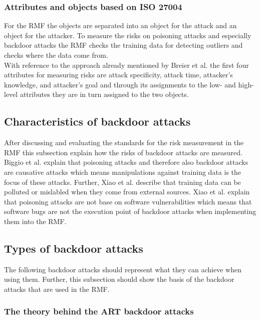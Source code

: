 \subsubsection*{Attributes and objects based on ISO 27004}

For the RMF the objects are separated into an object for the attack and an object for the attacker. To measure the risks on poisoning attacks and especially backdoor attacks the RMF checks the training data for detecting outliers and checks where the data come from. \\ With reference to the approach already mentioned by Breier et al. \cite{DBLP:journals/corr/abs-2012-04884} the first four attributes for measuring risks are attack specificity, attack time, attacker's knowledge, and attacker's goal and through its assignments to the low- and high-level attributes they are in turn assigned to the two objects. \\

\subsection{Characteristics of backdoor attacks}

After discussing and evaluating the standards for the risk measurement in the RMF this subsection explain how the risks of backdoor attacks are measured. Biggio et al. \cite{DBLP:conf/icml/BiggioNL12} explain that poisoning attacks and therefore also backdoor attacks are causative attacks which means manipulations against training data is the focus of these attacks. Further, Xiao et al. \cite{DBLP:conf/sp/XiaoLZX18} describe that training data can be polluted or mislabled when they come from external sources. Xiao et al. explain that poisoning attacks are not base on software vulnerabilities which means that software bugs are not the execution point of backdoor attacks when implementing them into the RMF.

\subsection{Types of backdoor attacks}

The following backdoor attacks should represent what they can achieve when using them. Further, this subsection should show the basis of the backdoor attacks that are used in the RMF.

\subsubsection*{The theory behind the ART backdoor attacks}

